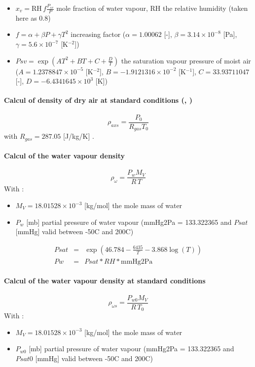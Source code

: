 \begin{itemize}
\begin{itemize}
		\item $x_v = $RH$\,f\frac{P_{sv}}{P}$ mole fraction of water vapour, RH the relative humidity (taken here as 0.8)
		\item $f = \alpha+\beta P+\gamma T^2$ increasing factor ($\alpha = 1.00062$ [-], $\beta  = 3.14\times 10^{-8}$ [Pa], $\gamma = 5.6\times 10^{-7}$ [K$^{-2}$])
		\item $Psv = \exp\left(AT^2+BT +C+\frac{D}{T}\right)$ the saturation vapour pressure of moist air ($A = 1.2378847\times 10^{-5}$ [K$^{-2}$], $B = -1.9121316\times 10^{-2}$ [K$^{-1}$], $C = 33.93711047$ [-], $D = -6.4341645\times 10^3$ [K])
	\end{itemize}	 
\end{itemize}

\paragraph*{Calcul of density of dry air at standard conditions (\cite{app:Wiki_HumidDensityAir}, \cite{airDensityBrisbane})}
\begin{equation}
	\rho_{axs} = \frac{P_0}{R_{gas}T_0}\label{subsubsec:rho_axs}
\end{equation}
with $R_{gas} = 287.05$ [J/kg/K] \cite{airDensityBrisbane}.

\paragraph*{Calcul of the water vapour density}
\begin{equation}
	\rho_\omega = \frac{P_wM_V}{R\,T}\label{subsubsec:rho_w}
\end{equation}
With :
\begin{itemize}
	\item $M_V = 18.01528\times 10^{-3}$ [kg/mol] the mole mass of water
	\item $P_w$ [mb] partial pressure of water vapour (mmHg2Pa = 133.322365 and $Psat$ [mmHg] valid between  -50\degree C and 200\degree C)
\end{itemize}

\begin{eqnarray}
	Psat &= &\exp\left(46.784-\frac{6435}{T}-3.868\log(T)\right)\nonumber\\
	Pw &= &Psat*RH*\text{mmHg2Pa}\nonumber
\end{eqnarray}	

\paragraph*{Calcul of the water vapour density at standard conditions}
\begin{equation}
	\rho_{\omega s} = \frac{P_{w0}M_V}{R\,T_0}\label{subsubsec:rho_ws}
\end{equation}
With :
\begin{itemize}
	\item $M_V = 18.01528\times 10^{-3}$ [kg/mol] the mole mass of water
	\item $P_{w0}$ [mb] partial pressure of water vapour (mmHg2Pa = 133.322365 and $Psat0$ [mmHg] valid between  -50\degree C and 200\degree C)
\end{itemize}

